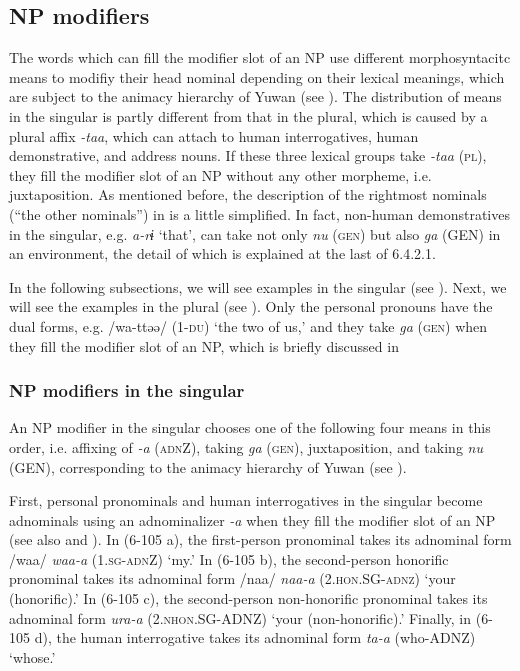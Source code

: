 \subsection{NP modifiers}

The words which can fill the modifier slot of an NP use different morphosyntacitc means to modifiy their head nominal depending on their lexical meanings, which are subject to the animacy hierarchy of Yuwan (see ). The distribution of means in the singular is partly different from that in the plural, which is caused by a plural affix \textit{{}-taa}, which can attach to human interrogatives, human demonstrative, and address nouns. If these three lexical groups take \textit{{}-taa} (\textsc{pl}), they fill the modifier slot of an NP without any other morpheme, i.e. juxtaposition. As mentioned before, the description of the rightmost nominals (“the other nominals”) in  is a little simplified. In fact, non-human demonstratives in the singular, e.g. \textit{a-rɨ} ‘that’, can take not only \textit{nu} (\textsc{gen}) but also \textit{ga} (GEN) in an environment, the detail of which is explained at the last of 6.4.2.1.

In the following subsections, we will see examples in the singular (see ). Next, we will see the examples in the plural (see ). Only the personal pronouns have the dual forms, e.g. /wa-ttəə/ (1-\textsc{du}) ‘the two of us,’ and they take \textit{ga} (\textsc{gen}) when they fill the modifier slot of an NP, which is briefly discussed in 

\subsubsection{NP modifiers in the singular}

An NP modifier in the singular chooses one of the following four means in this order, i.e. affixing of \textit{{}-a} (\textsc{adn}Z), taking \textit{ga} (\textsc{gen}), juxtaposition, and taking \textit{nu} (GEN), corresponding to the animacy hierarchy of Yuwan (see ).

First, personal pronominals and human interrogatives in the singular become adnominals using an adnominalizer \textit{{}-a} when they fill the modifier slot of an NP (see also  and ). In (6-105 a), the first-person pronominal takes its adnominal form /waa/ \textit{waa-a} (1.\textsc{sg}-\textsc{adn}Z) ‘my.’ In (6-105 b), the second-person honorific pronominal takes its adnominal form /naa/ \textit{naa-a} (2.\textsc{hon}.SG-\textsc{adnz}) ‘your (honorific).’ In (6-105 c), the second-person non-honorific pronominal takes its adnominal form \textit{ura-a} (2.\textsc{nhon}.SG-ADNZ) ‘your (non-honorific).’ Finally, in (6-105 d), the human interrogative takes its adnominal form \textit{ta-a} (who-ADNZ) ‘whose.’

